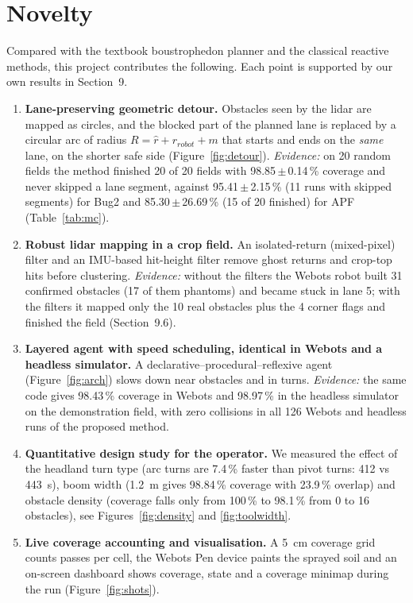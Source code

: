 \documentclass[12pt,a4paper]{article}
\begin{document}
\section{Novelty}
Compared with the textbook boustrophedon planner and the classical reactive methods, this project contributes the following. Each point is supported by our own results in Section~9.
\begin{enumerate}[itemsep=2pt,topsep=2pt]
\item \textbf{Lane-preserving geometric detour.} Obstacles seen by the lidar are mapped as circles, and the blocked part of the planned lane is replaced by a circular arc of radius $R=\hat r+r_{robot}+m$ that starts and ends on the \emph{same} lane, on the shorter safe side (Figure~\ref{fig:detour}). \emph{Evidence:} on 20 random fields the method finished 20 of 20 fields with 98.85\,$\pm$\,0.14\,\% coverage and never skipped a lane segment, against 95.41\,$\pm$\,2.15\,\% (11 runs with skipped segments) for Bug2 and 85.30\,$\pm$\,26.69\,\% (15 of 20 finished) for APF (Table~\ref{tab:mc}).
\item \textbf{Robust lidar mapping in a crop field.} An isolated-return (mixed-pixel) filter and an IMU-based hit-height filter remove ghost returns and crop-top hits before clustering. \emph{Evidence:} without the filters the Webots robot built 31 confirmed obstacles (17 of them phantoms) and became stuck in lane 5; with the filters it mapped only the 10 real obstacles plus the 4 corner flags and finished the field (Section~9.6).
\item \textbf{Layered agent with speed scheduling, identical in Webots and a headless simulator.} A declarative--procedural--reflexive agent (Figure~\ref{fig:arch}) slows down near obstacles and in turns. \emph{Evidence:} the same code gives 98.43\,\% coverage in Webots and 98.97\,\% in the headless simulator on the demonstration field, with zero collisions in all 126 Webots and headless runs of the proposed method.
\item \textbf{Quantitative design study for the operator.} We measured the effect of the headland turn type (arc turns are 7.4\,\% faster than pivot turns: 412 vs 443~s), boom width (1.2~m gives 98.84\,\% coverage with 23.9\,\% overlap) and obstacle density (coverage falls only from 100\,\% to 98.1\,\% from 0 to 16 obstacles), see Figures~\ref{fig:density} and \ref{fig:toolwidth}.
\item \textbf{Live coverage accounting and visualisation.} A 5~cm coverage grid counts passes per cell, the Webots Pen device paints the sprayed soil and an on-screen dashboard shows coverage, state and a coverage minimap during the run (Figure~\ref{fig:shots}).
\end{enumerate}
\end{document}
